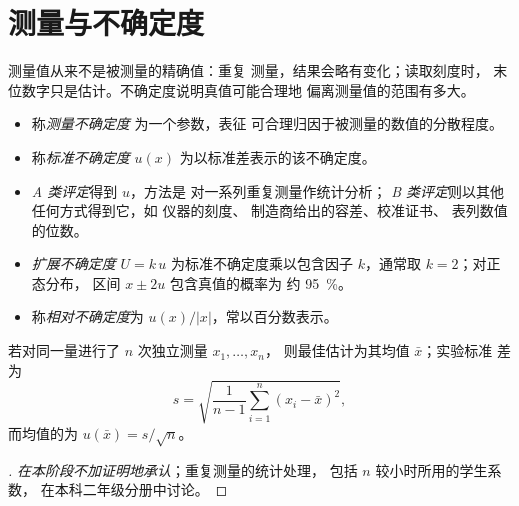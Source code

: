 \section{测量与不确定度}

测量值从来不是被测量的精确值：重复
测量，结果会略有变化；读取刻度时，
末位数字只是估计。不确定度说明真值可能合理地
偏离测量值的范围有多大。

\begin{definition}[测量不确定度]\label{def:b1:lab-techniques-1:uncertainty}
\begin{itemize}
  \item 称\emph{测量不确定度}
        为一个参数，表征
        可合理归因于被测量的数值的分散程度。
  \item 称\emph{标准不确定度} $u(x)$
        为以标准差表示的该不确定度。
  \item \emph{A 类评定}得到 $u$，方法是
        对一系列重复测量作统计分析；
        \emph{B 类评定}则以其他任何方式得到它，如
        仪器的刻度、
        制造商给出的容差、校准证书、
        表列数值的位数。
  \item \emph{扩展不确定度}
        $U = k\,u$ 为标准不确定度乘以包含因子
        $k$，通常取 $k = 2$；对正态分布，
        区间 $x \pm 2u$ 包含真值的概率为
        约 \qty{95}{\percent}。
  \item 称\emph{相对不确定度}为
        $u(x)/|x|$，常以百分数表示。
\end{itemize}
\end{definition}

\begin{proposition}[A 类评定]\label{prop:b1:lab-techniques-1:type-a}
若对同一量进行了 $n$ 次独立测量 $x_1, \dots, x_n$，
则最佳估计为其均值 $\bar x$；实验标准
差为
\[
  s = \sqrt{\frac{1}{n-1} \sum_{i=1}^{n} (x_i - \bar x)^2},
\]
而均值的为 $u(\bar x) = s/\sqrt{n}$。
\end{proposition}
\begin{proof}[\omnameProof]
\emph{在本阶段不加证明地承认}；重复测量的统计处理，
包括 $n$ 较小时所用的学生系数，
在本科二年级分册中讨论。
\end{proof}

